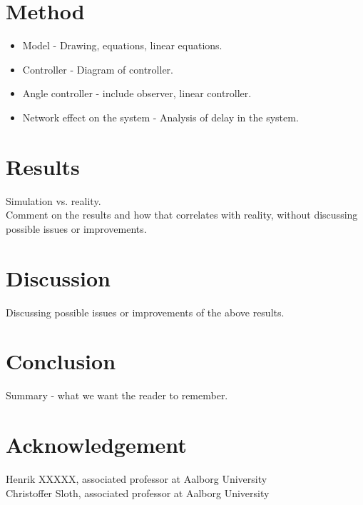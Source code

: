 \section{Method}
\begin{itemize}
\item Model - Drawing, equations, linear equations.
\item Controller - Diagram of controller.
	\item Angle controller - include observer, linear controller.
\item Network effect on the system - Analysis of delay in the system.
\end{itemize}
\section{Results}
Simulation vs. reality. \\
Comment on the results and how that correlates with reality, without discussing possible issues or improvements.

\section{Discussion}
Discussing possible issues or improvements of the above results.

\section{Conclusion}
Summary - what we want the reader to remember.
\section*{Acknowledgement}
Henrik XXXXX, associated professor at Aalborg University \\
Christoffer Sloth, associated professor at Aalborg University




%
%





